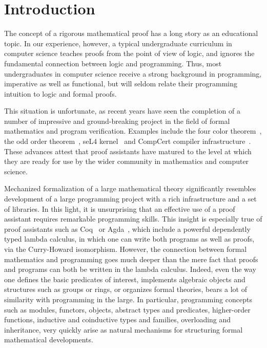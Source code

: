 \documentclass[blockstyle,preprint]{sigplanconf}
\begin{document}
\section{Introduction}
\label{sec:intro}

The concept of a rigorous mathematical proof has a long story as an
educational topic. In our experience, however, a typical undergraduate
curriculum in computer science teaches proofs from the point of view
of logic, and ignores the fundamental connection between logic and
programming. Thus, most undergraduates in computer science receive a
strong background in programming, imperative as well as functional,
but will seldom relate their programming intuition to logic and formal
proofs.

This situation is unfortunate, as recent years have seen the
completion of a number of impressive and ground-breaking project in
the field of formal mathematics and program verification. Examples
include the four color theorem~\cite{Gonthier:AMS08}, the odd order
theorem~\cite{Gonthier-al:ITP13}, seL4 kernel~\cite{Klein-al:TCS14}
and CompCert compiler infrastructure~\cite{Leroy:POPL06}. These
advances attest that proof assistants have matured to the level at
which they are ready for use by the wider community in mathematics and
computer science.

Mechanized formalization of a large mathematical theory significantly
resembles development of a large programming project with a rich
infrastructure and a set of libraries. In this light, it is
unsurprising that an effective use of a proof assistant requires
remarkable programming skills. This insight is especially true of
proof assistants such as Coq~\cite{Coq-manual} or
Agda~\cite{Norell:PhD}, which include a powerful dependently typed
lambda calculus, in which one can write both programs as well as
proofs, via the Curry-Howard isomorphism.  However, the connection
between formal mathematics and programming goes much deeper than the
mere fact that proofs and programs can both be written in the lambda
calculus.
%
Indeed, even the way one defines the basic predicates of interest,
implements algebraic objects and structures such as groups or rings,
or organizes formal theories, bears a lot of similarity with
programming in the large. In particular, programming concepts such as
modules, functors, objects, abstract types and predicates,
higher-order functions, inductive and coinductive types and families,
overloading and inheritance, very quickly arise as natural mechanisms
for structuring formal mathematical developments.
\end{document}
